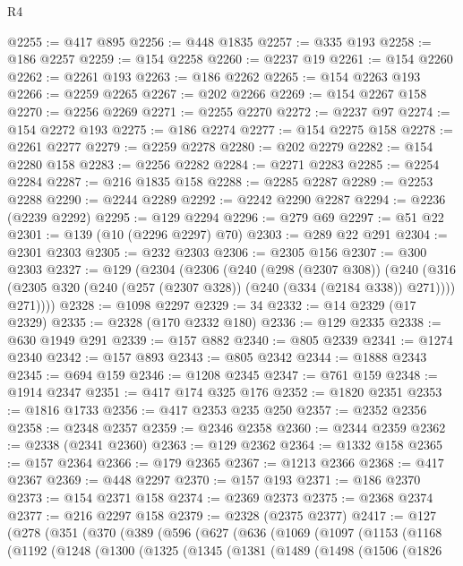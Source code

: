 \begin{lexlean}{R4}
\begin{coremodule}
@2255 := @417 @895
@2256 := @448 @1835
@2257 := @335 @193
@2258 := @186 @2257
@2259 := @154 @2258
@2260 := @2237 @19
@2261 := @154 @2260
@2262 := @2261 @193
@2263 := @186 @2262
@2265 := @154 @2263 @193
@2266 := @2259 @2265
@2267 := @202 @2266
@2269 := @154 @2267 @158
@2270 := @2256 @2269
@2271 := @2255 @2270
@2272 := @2237 @97
@2274 := @154 @2272 @193
@2275 := @186 @2274
@2277 := @154 @2275 @158
@2278 := @2261 @2277
@2279 := @2259 @2278
@2280 := @202 @2279
@2282 := @154 @2280 @158
@2283 := @2256 @2282
@2284 := @2271 @2283
@2285 := @2254 @2284
@2287 := @216 @1835 @158
@2288 := @2285 @2287
@2289 := @2253 @2288
@2290 := @2244 @2289
@2292 := @2242 @2290 @2287
@2294 := @2236 (@2239 @2292)
@2295 := @129 @2294
@2296 := @279 @69
@2297 := @51 @22
@2301 := @139 (@10 (@2296 @2297) @70)
@2303 := @289 @22 @291
@2304 := @2301 @2303
@2305 := @232 @2303
@2306 := @2305 @156
@2307 := @300 @2303
@2327 := @129
    (@2304
      (@2306
        (@240
          (@298 (@2307 @308))
          (@240
            (@316 (@2305 @320 (@240 (@257 (@2307 @328)) (@240 (@334 (@2184 @338)) @271))))
            @271))))
@2328 := @1098 @2297
@2329 := 34
@2332 := @14 @2329 (@17 @2329)
@2335 := @2328 (@170 @2332 @180)
@2336 := @129 @2335
@2338 := @630 @1949 @291
@2339 := @157 @882
@2340 := @805 @2339
@2341 := @1274 @2340
@2342 := @157 @893
@2343 := @805 @2342
@2344 := @1888 @2343
@2345 := @694 @159
@2346 := @1208 @2345
@2347 := @761 @159
@2348 := @1914 @2347
@2351 := @417 @174 @325 @176
@2352 := @1820 @2351
@2353 := @1816 @1733
@2356 := @417 @2353 @235 @250
@2357 := @2352 @2356
@2358 := @2348 @2357
@2359 := @2346 @2358
@2360 := @2344 @2359
@2362 := @2338 (@2341 @2360)
@2363 := @129 @2362
@2364 := @1332 @158
@2365 := @157 @2364
@2366 := @179 @2365
@2367 := @1213 @2366
@2368 := @417 @2367
@2369 := @448 @2297
@2370 := @157 @193
@2371 := @186 @2370
@2373 := @154 @2371 @158
@2374 := @2369 @2373
@2375 := @2368 @2374
@2377 := @216 @2297 @158
@2379 := @2328 (@2375 @2377)
@2417 := @127
    (@278
      (@351
        (@370
          (@389
            (@596
              (@627
                (@636
                  (@1069
                    (@1097
                      (@1153
                        (@1168
                          (@1192
                            (@1248
                              (@1300
                                (@1325
                                  (@1345
                                    (@1381
                                      (@1489
                                        (@1498
                                          (@1506
                                            (@1826

\end{coremodule}
\end{lexlean}
